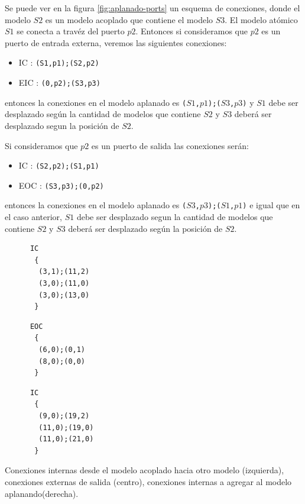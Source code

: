 \begin{itemize}
	Se puede ver en la figura \ref{fig:aplanado-ports} un esquema de conexiones, donde el modelo $S2$ es un modelo acoplado que contiene el modelo $S3$.
	 El modelo atómico $S1$ se conecta a travéz del puerto $p2$.
	 Entonces si consideramos que $p2$ es un puerto de entrada externa, veremos las siguientes conexiones:

	\begin{itemize}
	\item IC : \texttt{(S1,p1);(S2,p2)}
	\item EIC : \texttt{(0,p2);(S3,p3)}
	\end{itemize}

	entonces la conexiones en el modelo aplanado es \texttt{($S1$,$p1$);($S3$,$p3$)} y $S1$ debe ser desplazado según la cantidad de modelos que contiene $S2$ y 
	$S3$ deberá ser desplazado segun la posición de $S2$.

	Si consideramos que $p2$ es un puerto de salida las conexiones serán:

	\begin{itemize}
	\item IC : \texttt{(S2,p2);(S1,p1)}
	\item EOC : \texttt{(S3,p3);(0,p2)}
	\end{itemize}

	entonces la conexiones en el modelo aplanado es \texttt{($S3$,$p3$);($S1$,$p1$)} e igual que en el caso anterior, $S1$ debe ser desplazado segun la 
	cantidad de modelos que contiene $S2$ y $S3$ deberá ser desplazado según la posición de $S2$.


\begin{listing}
\begin{minipage}[t]{0.3\linewidth}
\begin{verbatim}
      IC
       {
        (3,1);(11,2)
        (3,0);(11,0)
        (3,0);(13,0)
       }
\end{verbatim}
\end{minipage}
\begin{minipage}[t]{0.3\linewidth}
\begin{verbatim}
      EOC
       {
        (6,0);(0,1)
        (8,0);(0,0)
       }
\end{verbatim}
\end{minipage}
\begin{minipage}[t]{0.3\linewidth}
\begin{verbatim}
      IC
       {
        (9,0);(19,2)
        (11,0);(19,0)
        (11,0);(21,0)
       }
\end{verbatim}
\end{minipage}
\label{lst:conexiones3}
\caption{Conexiones internas desde el modelo acoplado hacia otro modelo (izquierda), conexiones externas de salida (centro), conexiones internas a agregar al modelo aplanando(derecha).}
\end{listing}


\end{itemize}

